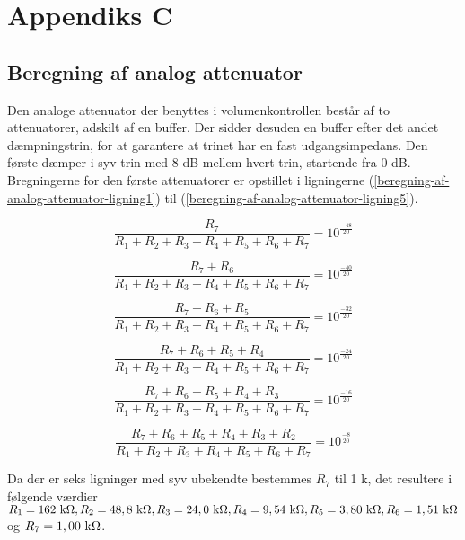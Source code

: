 \chapter{Appendiks C}
\label{beregning-af-analog-attenuator}
\section*{Beregning af analog attenuator}

Den analoge attenuator der benyttes i volumenkontrollen består af to attenuatorer, adskilt af en buffer. Der sidder desuden en buffer efter det andet dæmpningstrin, for at garantere at trinet har en fast udgangsimpedans. Den første dæmper i syv trin med 8 dB mellem hvert trin, startende fra 0 dB. Bregningerne for den første attenuatorer er opstillet i ligningerne (\ref{beregning-af-analog-attenuator-ligning1}) til (\ref{beregning-af-analog-attenuator-ligning5}).

\begin{equation}
\label{beregning-af-analog-attenuator-ligning1}
\frac{R_7}{R_1 + R_2 + R_3 + R_4 + R_5 + R_6 + R_7} = 10^{\frac{-48}{20}}
\end{equation}

\begin{equation}
\frac{R_7 + R_6}{R_1 + R_2 + R_3 + R_4 + R_5 + R_6 + R_7} = 10^{\frac{-40}{20}}
\end{equation}

\begin{equation}
\frac{R_7 + R_6 + R_5}{R_1 + R_2 + R_3 + R_4 + R_5 + R_6 + R_7} = 10^{\frac{-32}{20}}
\end{equation}

\begin{equation}
\frac{R_7 + R_6 + R_5 + R_4}{R_1 + R_2 + R_3 + R_4 + R_5 + R_6 + R_7} = 10^{\frac{-24}{20}}
\end{equation}

\begin{equation}
\frac{R_7 + R_6 + R_5 + R_4 + R_3}{R_1 + R_2 + R_3 + R_4 + R_5 + R_6 + R_7} = 10^{\frac{-16}{20}}
\end{equation}

\begin{equation}
\label{beregning-af-analog-attenuator-ligning5}
\frac{R_7 + R_6 + R_5 + R_4 + R_3 + R_2}{R_1 + R_2 + R_3 + R_4 + R_5 + R_6 + R_7} = 10^{\frac{-8}{20}}
\end{equation}

Da der er seks ligninger med syv ubekendte bestemmes $R_7$ til 1 k\ohm, det resultere i følgende værdier 
$R_1 = 162 ~\mathrm{k}\ohm, R_2 = 48,8 ~\mathrm{k}\ohm, R_3 = 24,0 ~\mathrm{k}\ohm, R_4 = 9,54 ~\mathrm{k}\ohm, R_5 = 3,80  ~\mathrm{k}\ohm, R_6 = 1,51 ~\mathrm{k}\ohm$ og $R_7 = 1,00 ~\mathrm{k}\ohm$.

